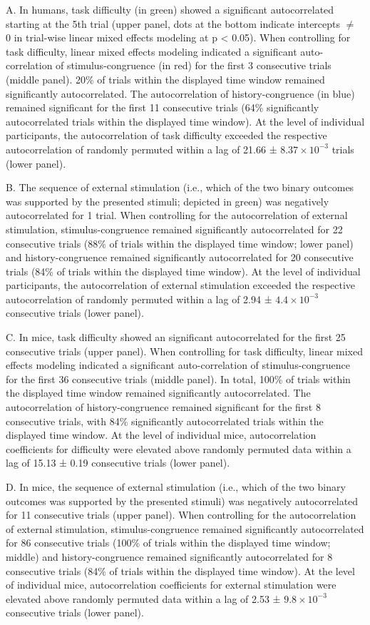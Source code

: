 \documentclass[
]{article}
\begin{document}
A. In humans, task difficulty (in green) showed a significant
autocorrelated starting at the 5th trial (upper panel, dots at the
bottom indicate intercepts \(\neq\) 0 in trial-wise linear mixed effects
modeling at p \textless{} 0.05). When controlling for task difficulty,
linear mixed effects modeling indicated a significant auto-correlation
of stimulus-congruence (in red) for the first 3 consecutive trials
(middle panel). 20\% of trials within the displayed time window remained
significantly autocorrelated. The autocorrelation of history-congruence
(in blue) remained significant for the first 11 consecutive trials (64\%
significantly autocorrelated trials within the displayed time window).
At the level of individual participants, the autocorrelation of task
difficulty exceeded the respective autocorrelation of randomly permuted
within a lag of 21.66 ± \ensuremath{8.37\times 10^{-3}} trials (lower
panel).

B. The sequence of external stimulation (i.e., which of the two binary
outcomes was supported by the presented stimuli; depicted in green) was
negatively autocorrelated for 1 trial. When controlling for the
autocorrelation of external stimulation, stimulus-congruence remained
significantly autocorrelated for 22 consecutive trials (88\% of trials
within the displayed time window; lower panel) and history-congruence
remained significantly autocorrelated for 20 consecutive trials (84\% of
trials within the displayed time window). At the level of individual
participants, the autocorrelation of external stimulation exceeded the
respective autocorrelation of randomly permuted within a lag of 2.94 ±
\ensuremath{4.4\times 10^{-3}} consecutive trials (lower panel).

C. In mice, task difficulty showed an significant autocorrelated for the
first 25 consecutive trials (upper panel). When controlling for task
difficulty, linear mixed effects modeling indicated a significant
auto-correlation of stimulus-congruence for the first 36 consecutive
trials (middle panel). In total, 100\% of trials within the displayed
time window remained significantly autocorrelated. The autocorrelation
of history-congruence remained significant for the first 8 consecutive
trials, with 84\% significantly autocorrelated trials within the
displayed time window. At the level of individual mice, autocorrelation
coefficients for difficulty were elevated above randomly permuted data
within a lag of 15.13 ± 0.19 consecutive trials (lower panel).

D. In mice, the sequence of external stimulation (i.e., which of the two
binary outcomes was supported by the presented stimuli) was negatively
autocorrelated for 11 consecutive trials (upper panel). When controlling
for the autocorrelation of external stimulation, stimulus-congruence
remained significantly autocorrelated for 86 consecutive trials (100\%
of trials within the displayed time window; middle) and
history-congruence remained significantly autocorrelated for 8
consecutive trials (84\% of trials within the displayed time window). At
the level of individual mice, autocorrelation coefficients for external
stimulation were elevated above randomly permuted data within a lag of
2.53 ± \ensuremath{9.8\times 10^{-3}} consecutive trials (lower panel).
\end{document}
